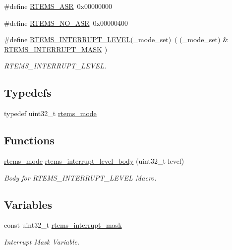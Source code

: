 \begin{DoxyCompactItemize}
\#define \mbox{\hyperlink{group__ClassicModes_ga70cd9a55b09454b95608db57279607cd}{R\+T\+E\+M\+S\+\_\+\+A\+SR}}~0x00000000
\item 
\#define \mbox{\hyperlink{group__ClassicModes_gad67a5c6d7c644641c29a800b327549bb}{R\+T\+E\+M\+S\+\_\+\+N\+O\+\_\+\+A\+SR}}~0x00000400
\item 
\#define \mbox{\hyperlink{group__ClassicModes_ga39a1f6143434df1c0bae66cbb083de94}{R\+T\+E\+M\+S\+\_\+\+I\+N\+T\+E\+R\+R\+U\+P\+T\+\_\+\+L\+E\+V\+EL}}(\+\_\+mode\+\_\+set)~( (\+\_\+mode\+\_\+set) \& \mbox{\hyperlink{group__ClassicModes_gaebcf8a52ba62835e741e5325a537a9af}{R\+T\+E\+M\+S\+\_\+\+I\+N\+T\+E\+R\+R\+U\+P\+T\+\_\+\+M\+A\+SK}} )
\begin{DoxyCompactList}\small\item\em R\+T\+E\+M\+S\+\_\+\+I\+N\+T\+E\+R\+R\+U\+P\+T\+\_\+\+L\+E\+V\+EL. \end{DoxyCompactList}\end{DoxyCompactItemize}
\subsection*{Typedefs}
\begin{DoxyCompactItemize}
\item 
typedef uint32\+\_\+t \mbox{\hyperlink{group__ClassicModes_ga8d46a41a837840dc97336fdcd20e4f68}{rtems\+\_\+mode}}
\end{DoxyCompactItemize}
\subsection*{Functions}
\begin{DoxyCompactItemize}
\item 
\mbox{\hyperlink{group__ClassicModes_ga8d46a41a837840dc97336fdcd20e4f68}{rtems\+\_\+mode}} \mbox{\hyperlink{group__ClassicModes_ga5a9011dd2e307053b08b25aa7574b4f8}{rtems\+\_\+interrupt\+\_\+level\+\_\+body}} (uint32\+\_\+t level)
\begin{DoxyCompactList}\small\item\em Body for R\+T\+E\+M\+S\+\_\+\+I\+N\+T\+E\+R\+R\+U\+P\+T\+\_\+\+L\+E\+V\+EL Macro. \end{DoxyCompactList}\end{DoxyCompactItemize}
\subsection*{Variables}
\begin{DoxyCompactItemize}
\item 
const uint32\+\_\+t \mbox{\hyperlink{group__ClassicModes_ga81fe5af4a8525fcad74ad8f30a691f12}{rtems\+\_\+interrupt\+\_\+mask}}
\begin{DoxyCompactList}\small\item\em Interrupt Mask Variable. \end{DoxyCompactList}\end{DoxyCompactItemize}


